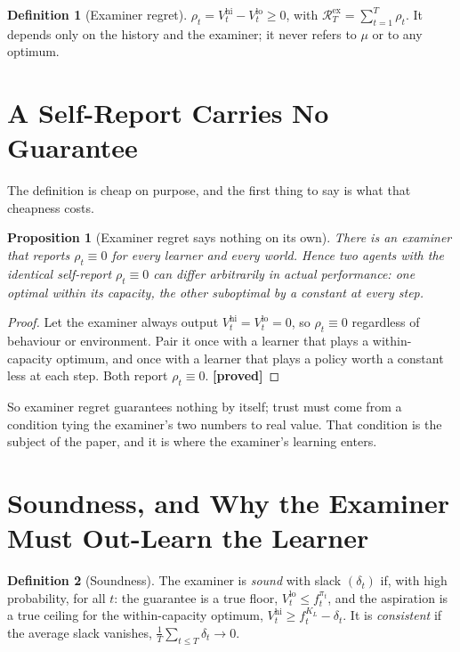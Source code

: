 \documentclass[10pt]{article} %
\theoremstyle{definition}
\newtheorem{definition}{Definition}
\theoremstyle{plain}
\newtheorem{proposition}{Proposition}
\newcommand{\Vlow}{V^{\mathrm{lo}}_t}
\newcommand{\Vhi}{V^{\mathrm{hi}}_t}
\newcommand{\Rex}{\mathcal{R}^{\mathrm{ex}}}
\begin{document}
\begin{definition}[Examiner regret]
\label{def:exreg}
$\rho_t = \Vhi - \Vlow \ge 0$, with $\Rex_T = \sum_{t=1}^T \rho_t$. It depends only on the history and the examiner; it never refers to $\mu$ or to any optimum.
\end{definition}

\section{A Self-Report Carries No Guarantee}
\label{sec:nothing}

The definition is cheap on purpose, and the first thing to say is what that cheapness costs.

\begin{proposition}[Examiner regret says nothing on its own]
\label{prop:nothing}
There is an examiner that reports $\rho_t \equiv 0$ for every learner and every world. Hence two agents with the identical self-report $\rho_t \equiv 0$ can differ arbitrarily in actual performance: one optimal within its capacity, the other suboptimal by a constant at every step.
\end{proposition}

\begin{proof}
Let the examiner always output $\Vhi = \Vlow = 0$, so $\rho_t \equiv 0$ regardless of behaviour or environment. Pair it once with a learner that plays a within-capacity optimum, and once with a learner that plays a policy worth a constant less at each step. Both report $\rho_t \equiv 0$. \textbf{[proved]}
\end{proof}

So examiner regret guarantees nothing by itself; trust must come from a condition tying the examiner's two numbers to real value. That condition is the subject of the paper, and it is where the examiner's learning enters.

\section{Soundness, and Why the Examiner Must Out-Learn the Learner}
\label{sec:sound}

\begin{definition}[Soundness]
\label{def:sound}
The examiner is \emph{sound} with slack $(\delta_t)$ if, with high probability, for all $t$: the guarantee is a true floor, $\Vlow \le f^{\pi_t}_t$, and the aspiration is a true ceiling for the within-capacity optimum, $\Vhi \ge f^{K_L}_t - \delta_t$. It is \emph{consistent} if the average slack vanishes, $\frac1T\sum_{t\le T}\delta_t \to 0$.
\end{definition}
\end{document}
